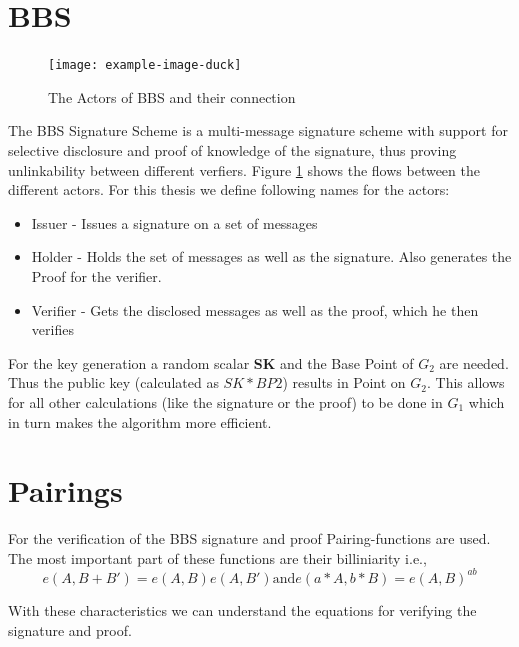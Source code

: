\documentclass[
	a4paper               %
	,bibliography=totoc   %
	,listof=totoc         %
	,monolingual
]{bfhthesis}              %
\begin{document}
\section{BBS}
\label{sec:bbs}
\begin{figure}[h]
    \centering
	\texttt{[image: example-image-duck]}
	\caption{The Actors of BBS and their connection}
	\label{fig:bbstriangle}
\end{figure}
The BBS Signature Scheme \cite{bbs-signature-scheme} is a multi-message signature scheme with support for selective disclosure and proof of knowledge of the signature, thus proving unlinkability between different verfiers. 
Figure \ref{fig:bbstriangle} shows the flows between the different actors.
For this thesis we define following names for the actors:
\begin{itemize}
	\item Issuer - Issues a signature on a set of messages
	\item Holder - Holds the set of messages as well as the signature. Also generates the Proof for the verifier.
	\item Verifier - Gets the disclosed messages as well as the proof, which he then verifies
\end{itemize}
For the key generation a random scalar \textbf{SK} and the Base Point of $G_2$ are needed.
Thus the public key (calculated as $SK*BP2$) results in Point on $G_2$.
This allows for all other calculations (like the signature or the proof) to be done in $G_1$ which in turn makes the algorithm more efficient.


\section{Pairings}
\label{sec:pairing}
For the verification of the BBS signature and proof Pairing-functions are used. The most important part of these functions are their billiniarity i.e.,\newline
\begin{equation}
		e(A, B + B') = e(A, B)e(A, B') \text{and} e(a * A, b * B) = e(A, B)^{ab}
\end{equation}

With these characteristics we can understand the equations for verifying the signature and proof.\newline
\end{document}
